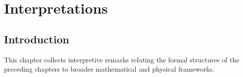 \chapter{Interpretations}
\label{chap:interpretations}

\section{Introduction}
\label{sec:interpretations-intro}

This chapter collects interpretive remarks relating the formal structures of
the preceding chapters to broader mathematical and physical frameworks.
